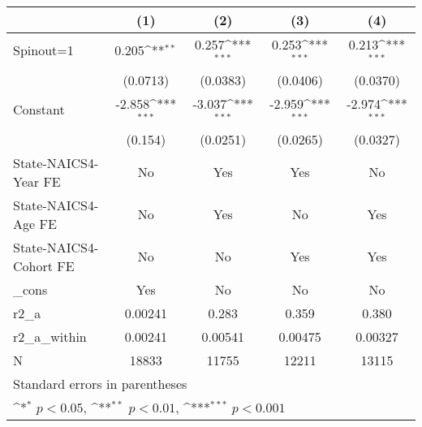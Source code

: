 {
\def\sym#1{\ifmmode^{#1}\else\(^{#1}\)\fi}
\begin{tabular}{l*{4}{c}}
\hline\hline
                    &\multicolumn{1}{c}{(1)}         &\multicolumn{1}{c}{(2)}         &\multicolumn{1}{c}{(3)}         &\multicolumn{1}{c}{(4)}         \\
\hline
Spinout=1           &       0.205\sym{**} &       0.257\sym{***}&       0.253\sym{***}&       0.213\sym{***}\\
                    &    (0.0713)         &    (0.0383)         &    (0.0406)         &    (0.0370)         \\
[1em]
Constant            &      -2.858\sym{***}&      -3.037\sym{***}&      -2.959\sym{***}&      -2.974\sym{***}\\
                    &     (0.154)         &    (0.0251)         &    (0.0265)         &    (0.0327)         \\
[1em]
State-NAICS4-Year FE&          No         &         Yes         &         Yes         &          No         \\
[1em]
State-NAICS4-Age FE &          No         &         Yes         &          No         &         Yes         \\
[1em]
State-NAICS4-Cohort FE&          No         &          No         &         Yes         &         Yes         \\
[1em]
\_cons              &         Yes         &          No         &          No         &          No         \\
\hline
r2\_a                &     0.00241         &       0.283         &       0.359         &       0.380         \\
r2\_a\_within         &     0.00241         &     0.00541         &     0.00475         &     0.00327         \\
N                   &       18833         &       11755         &       12211         &       13115         \\
\hline\hline
\multicolumn{5}{l}{\footnotesize Standard errors in parentheses}\\
\multicolumn{5}{l}{\footnotesize \sym{*} \(p<0.05\), \sym{**} \(p<0.01\), \sym{***} \(p<0.001\)}\\
\end{tabular}
}
